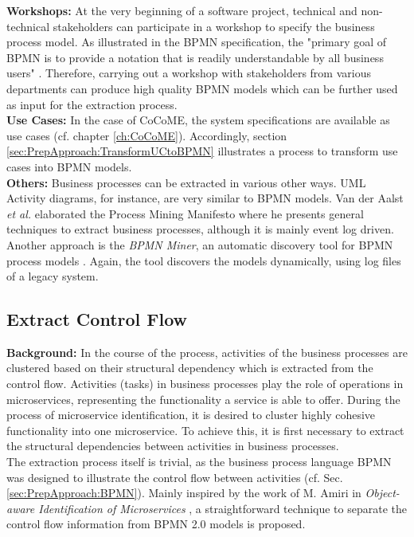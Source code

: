\noindent
\textbf{Workshops:} At the very beginning of a software project, technical and non-technical stakeholders can participate in a workshop to specify the business process model. As illustrated in the BPMN specification, the "primary goal of BPMN is to provide a notation that is readily understandable by all business users"  \cite{OMG}. Therefore, carrying out a workshop with stakeholders from various departments can produce high quality BPMN models which can be further used as input for the extraction process.\\
\textbf{Use Cases:} In the case of CoCoME, the system specifications are available as use cases (cf. chapter \ref{ch:CoCoME}). 
Accordingly, section \ref{sec:PrepApproach:TransformUCtoBPMN} illustrates a process to transform use cases into BPMN models.  \\
\textbf{Others:} Business processes can be extracted in various other ways. UML Activity diagrams, for instance, are very similar to BPMN models. Van der Aalst \textit{et al.} elaborated the Process Mining Manifesto \cite{ProcessMiningManifesto} where he presents general techniques to extract business processes, although it is mainly event log driven. Another approach is the \textit{BPMN Miner}, an automatic discovery tool for BPMN process models \cite{BPMNMiner}. Again, the tool discovers the models dynamically, using log files of a legacy system.









\subsection{Extract Control Flow}
\label{sec:Solution:ExtractControlFlow}
\textbf{Background:} In the course of the process, activities of the business processes are clustered based on their structural dependency which is extracted from the control flow. Activities (tasks) in business processes play the role of operations in microservices, representing the functionality a service is able to offer. During the process of microservice identification, it is desired to cluster highly cohesive functionality into one microservice. To achieve this, it is first necessary to extract the structural  dependencies between activities in business processes. \\
The extraction process itself is trivial, as the business process language BPMN was designed to illustrate the control flow between activities (cf. Sec.\ref{sec:PrepApproach:BPMN}). Mainly inspired by the work of M. Amiri in \textit{Object-aware Identification of Microservices} \cite{ObjectAwareAmiri}, a straightforward technique to separate the control flow information from BPMN 2.0 models is proposed.\\

